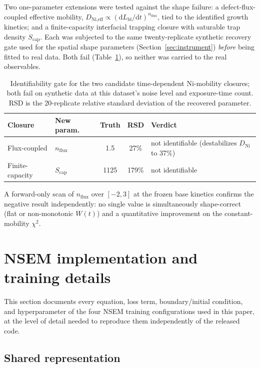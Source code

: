 Two one-parameter extensions were tested against the shape failure: a
defect-flux-coupled effective mobility, $D_\text{Ni,eff} \propto
(\mathrm{d}L_\mathrm{bl}/\mathrm{d}t)^{n_\text{flux}}$, tied to the
identified growth kinetics; and a finite-capacity interfacial trapping
closure with saturable trap density $S_\text{cap}$. Each was subjected
to the same twenty-replicate synthetic recovery gate used for the
spatial shape parameters (Section~\ref{sec:instrument}) \emph{before}
being fitted to real data. Both fail (Table~\ref{tab:ni-closures}), so
neither was carried to the real observables.

\begin{table}[htbp]
\centering
\caption{Identifiability gate for the two candidate time-dependent
Ni-mobility closures; both fail on synthetic data at this dataset's
noise level and exposure-time count. RSD is the 20-replicate relative
standard deviation of the recovered parameter.}
\label{tab:ni-closures}
\begin{tabular}{llccl}
\toprule
Closure & New param. & Truth & RSD & Verdict \\
\midrule
Flux-coupled & $n_\text{flux}$ & 1.5 & 27\% & not identifiable (destabilizes $D_\text{Ni}$ to 37\%) \\
Finite-capacity & $S_\text{cap}$ & 1125 & 179\% & not identifiable \\
\bottomrule
\end{tabular}
\end{table}

A forward-only scan of $n_\text{flux}$ over $[-2, 3]$ at the frozen base
kinetics confirms the negative result independently: no single value is
simultaneously shape-correct (flat or non-monotonic $W(t)$) and a
quantitative improvement on the constant-mobility $\chi^2$.

\section{NSEM implementation and training details}
\label{sec:nsem-details}

This section documents every equation, loss term, boundary/initial
condition, and hyperparameter of the four NSEM training configurations
used in this paper, at the level of detail needed to reproduce them
independently of the released code.

\subsection{Shared representation}

